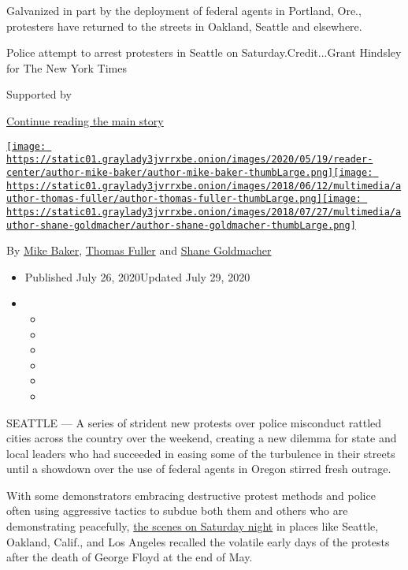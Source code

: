 Galvanized in part by the deployment of federal agents in Portland,
Ore., protesters have returned to the streets in Oakland, Seattle and
elsewhere.

Police attempt to arrest protesters in Seattle on
Saturday.Credit...Grant Hindsley for The New York Times

Supported by

\protect\hyperlink{after-sponsor}{Continue reading the main story}

\href{https://www.nytimes3xbfgragh.onion/by/mike-baker}{\texttt{[image: https://static01.graylady3jvrrxbe.onion/images/2020/05/19/reader-center/author-mike-baker/author-mike-baker-thumbLarge.png]}}\href{https://www.nytimes3xbfgragh.onion/by/thomas-fuller}{\texttt{[image: https://static01.graylady3jvrrxbe.onion/images/2018/06/12/multimedia/author-thomas-fuller/author-thomas-fuller-thumbLarge.png]}}\href{https://www.nytimes3xbfgragh.onion/by/shane-goldmacher}{\texttt{[image: https://static01.graylady3jvrrxbe.onion/images/2018/07/27/multimedia/author-shane-goldmacher/author-shane-goldmacher-thumbLarge.png]}}

By \href{https://www.nytimes3xbfgragh.onion/by/mike-baker}{Mike Baker},
\href{https://www.nytimes3xbfgragh.onion/by/thomas-fuller}{Thomas
Fuller} and
\href{https://www.nytimes3xbfgragh.onion/by/shane-goldmacher}{Shane
Goldmacher}

\begin{itemize}
\item
  Published July 26, 2020Updated July 29, 2020
\item
  \begin{itemize}
  \item
  \item
  \item
  \item
  \item
  \item
  \end{itemize}
\end{itemize}

SEATTLE --- A series of strident new protests over police misconduct
rattled cities across the country over the weekend, creating a new
dilemma for state and local leaders who had succeeded in easing some of
the turbulence in their streets until a showdown over the use of federal
agents in Oregon stirred fresh outrage.

With some demonstrators embracing destructive protest methods and police
often using aggressive tactics to subdue both them and others who are
demonstrating peacefully,
\href{https://www.nytimes3xbfgragh.onion/2020/07/25/us/protests-seattle-portland.html}{the
scenes on Saturday night} in places like Seattle, Oakland, Calif., and
Los Angeles recalled the volatile early days of the protests after the
death of George Floyd at the end of May.

